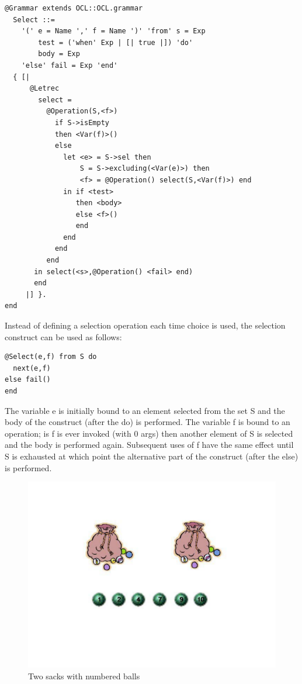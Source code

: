 \begin{lstlisting}
@Grammar extends OCL::OCL.grammar
  Select ::= 
    '(' e = Name ',' f = Name ')' 'from' s = Exp 
        test = ('when' Exp | [| true |]) 'do' 
        body = Exp 
    'else' fail = Exp 'end' 
  { [|
      @Letrec
        select = 
          @Operation(S,<f>)
            if S->isEmpty
            then <Var(f)>()
            else 
              let <e> = S->sel then
                  S = S->excluding(<Var(e)>) then
                  <f> = @Operation() select(S,<Var(f)>) end
              in if <test>
                 then <body>
                 else <f>()
                 end
              end
            end
          end
       in select(<s>,@Operation() <fail> end)
       end
     |] }.
end
\end{lstlisting}Instead of defining a selection operation each time choice is used,
the selection construct can be used as follows:

\begin{lstlisting}
@Select(e,f) from S do
  next(e,f)
else fail()
end
\end{lstlisting}The variable e is initially bound to an element selected from the
set S and the body of the construct (after the do) is performed. The
variable f is bound to an operation; is f is ever invoked (with 0
args) then another element of S is selected and the body is performed
again. Subsequent uses of f have the same effect until S is exhausted
at which point the alternative part of the construct (after the else)
is performed.

%
\begin{figure}
\begin{center}

\includegraphics[width=12cm]{LanguageEngineering/Choice/Images/Sacks}

\caption{\label{fig:Two-sacks-with}Two sacks with numbered balls}

\end{center}
\end{figure}


